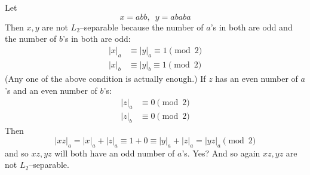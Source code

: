 Let
\[
x = abb, \,\,\, y = ababa
\]
Then $x,y$ are not $L_2$--separable because
the number of $a$'s in both are odd
and the number of $b$'s in both are odd:
\begin{align*}
|x|_a &\equiv |y|_a \equiv 1 \pmod{2} \\
|x|_b &\equiv |y|_b \equiv 1 \pmod{2}
\end{align*}
(Any one of the above condition is actually enough.)
If $z$ has an even number of $a$'s
and an even number of $b$'s:
\begin{align*}
  |z|_a &\equiv 0 \pmod{2} \\
  |z|_b &\equiv 0 \pmod{2}
\end{align*}
Then
\[
|xz|_a = |x|_a + |z|_a \equiv 1 + 0 \equiv |y|_a + |z|_a = |yz|_a \pmod{2}
\]
and so $xz, yz$ will both have an odd number of $a$'s. Yes?
And so again $xz,yz$ are not $L_2$--separable.


  
